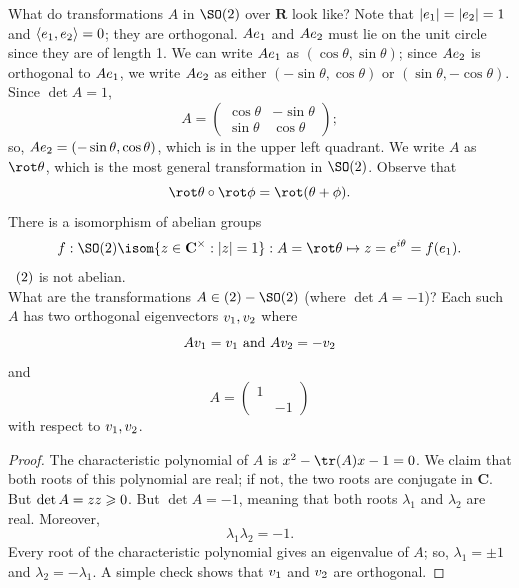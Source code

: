 \documentclass[11pt, oneside]{amsart}
\numberwithin{equation}{section}
\numberwithin{theorem}{section}
\theoremstyle{definition}
\let\O\relax
\let\bar\relax
\let\bf\relax
\def\R{\mathbf{R}}
\def\C{\mathbf{C}}
\begin{document}
What do transformations $A$ in $\SO(2)$ over $\R$ look like? Note that $|\bf e_1| = |\bf e_2| = 1$ and $\langle \bf e_1,\bf e_2\rangle = 0$; they are orthogonal. $A\bf e_1$ and $A\bf e_2$ must lie on the unit circle since they are of length 1. We can write $A\bf e_1$ as $(\cos\theta, \sin\theta)$; since $A\bf e_2$ is orthogonal to $A\bf e_1$, we write $A\bf e_2$ as either $(-\sin\theta, \cos\theta)$ or $(\sin\theta, -\cos\theta)$. Since $\det A = 1$, 
$$
A = \left(\begin{array}{cc} \cos\theta & -\sin\theta\\ \sin\theta & \cos\theta\end{array}\right);
$$ 
so, $A\bf e_2 = (-\sin\theta, \cos\theta)$, which is in the upper left quadrant. We write $A$ as $\rot\theta$, which is the most general transformation in $\SO(2)$.
Observe that 
$$
\rot\theta \circ \rot\phi = \rot(\theta + \phi).
$$
There is a isomorphism of abelian groups
$$
f : \SO(2) \isom \{z\in \C^\times : |z| =1\} : A =\rot \theta \mapsto z = e^{i\theta} = f(\bf e_1).
$$
\dbend \ $\O(2)$ is not abelian. \\

What are the transformations $A\in \O(2)-\SO(2)$ (where $\det A = -1$)? Each such $A$ has two orthogonal eigenvectors $\bf v_1, \bf v_2$ where 
$$
A\bf v_1 = \bf v_1 \textrm{ and } A\bf v_2 = -\bf v_2 
$$
and 
$$
A = \left(\begin{array}{cc} 1 &\\ & -1\end{array}\right) 
$$
with respect to $\bf v_1, \bf v_2$.
\begin{proof}
The characteristic polynomial of $A$ is $x^2 -\tr(A)x-1 = 0$. We claim that both roots of this polynomial are real; if not, the two roots are conjugate in $\C$. But $\det A = z\bar{z}\geqslant 0$. But $\det A = -1$, meaning that both roots $\lambda_1$ and $\lambda_2$ are real. Moreover,
$$
\lambda_1\lambda_2 = -1.
$$
Every root of the characteristic polynomial gives an eigenvalue of $A$; so, $\lambda_1 = \pm 1$ and $\lambda_2 = -\lambda_1$. A simple check shows that $\bf v_1$ and $\bf v_2$ are orthogonal.
\end{proof}
\end{document}

